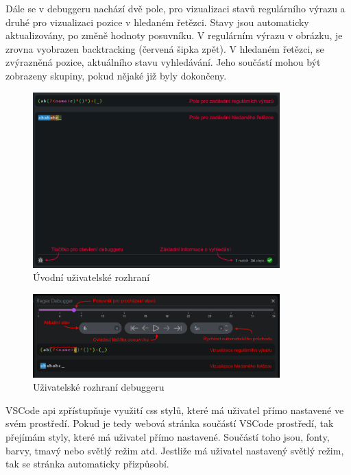 Dále se v debuggeru nachází dvě pole, pro vizualizaci stavů regulárního výrazu a druhé pro vizualizaci pozice v hledaném řetězci.
Stavy jsou automaticky aktualizovány, po změně hodnoty posuvníku.
V regulárním výrazu v obrázku, je zrovna vyobrazen backtracking (červená šipka zpět).
V hledaném řetězci, se zvýrazněná pozice, aktuálního stavu vyhledávání.
Jeho součástí mohou být zobrazeny skupiny, pokud nějaké již byly dokončeny.

\begin{figure}[!h]
	\centering
	\includegraphics[width=0.85\textwidth]{Figures/appWindow.png}
	\caption{Úvodní uživatelské rozhraní}
	\label{fig:GeneralUI}
\end{figure}

\begin{figure}[!h]
	\centering
	\includegraphics[width=0.85\textwidth]{Figures/appDebugger.png}
	\caption{Uživatelské rozhraní debuggeru}
	\label{fig:DebuggerUI}
\end{figure}

VSCode api zpřístupňuje využití css stylů, které má uživatel přímo nastavené ve svém prostředí.
Pokud je tedy webová stránka součástí VSCode prostředí, tak přejímám styly, které má uživatel přímo nastavené.
Součástí toho jsou, fonty, barvy, tmavý nebo světlý režim atd.
Jestliže má uživatel nastavený světlý režim, tak se stránka automaticky přizpůsobí.

\endinput